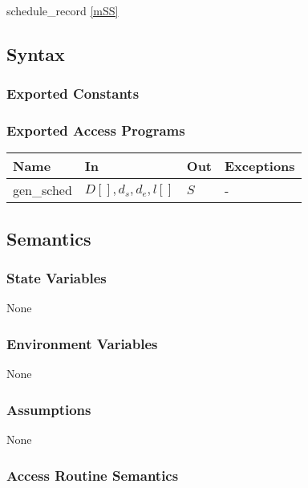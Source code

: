 \documentclass[12pt, titlepage]{article}
\begin{document}
schedule\_record \ref{mSS}

\subsection{Syntax}

\subsubsection{Exported Constants}

\subsubsection{Exported Access Programs}

\begin{center}
\begin{tabular}{p{2cm} p{4cm} p{4cm} p{2cm}}
\hline
\textbf{Name} & \textbf{In} & \textbf{Out} & \textbf{Exceptions} \\
\hline
gen\_sched & $D[], d_s, d_e, l[]$ & $S$ & - \\
\hline
\end{tabular}
\end{center}

\subsection{Semantics}

\subsubsection{State Variables}

None

\subsubsection{Environment Variables}

None

\subsubsection{Assumptions}


None

\subsubsection{Access Routine Semantics}
\end{document}
